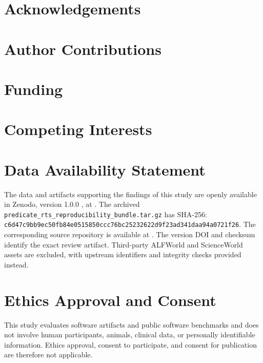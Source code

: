 \section*{Acknowledgements}
\STVRAcknowledgements

\section*{Author Contributions}
\STVRCreditStatement

\section*{Funding}
\STVRFundingStatement

\section*{Competing Interests}
\STVRConflictStatement

\section*{Data Availability Statement}
The data and artifacts supporting the findings of this study are openly
available in Zenodo, version 1.0.0 \citep{song2026predicateimpactdataset}, at
\STVRArchiveLink. The archived
\texttt{predicate\_rts\_reproducibility\_bundle.tar.gz} has SHA-256:
\nolinkurl{c6d47c9bb9ec50fb84e0515850ccc76bc25232622d9f23ad341daa94a0721f26}.
The corresponding source repository is available at \STVRRepositoryLink. The
version DOI and checksum identify the exact review artifact. Third-party
ALFWorld and ScienceWorld assets are excluded, with upstream identifiers and
integrity checks provided instead.

\section*{Ethics Approval and Consent}
This study evaluates software artifacts and public software benchmarks and does
not involve human participants, animals, clinical data, or personally
identifiable information. Ethics approval, consent to participate, and consent
for publication are therefore not applicable.
